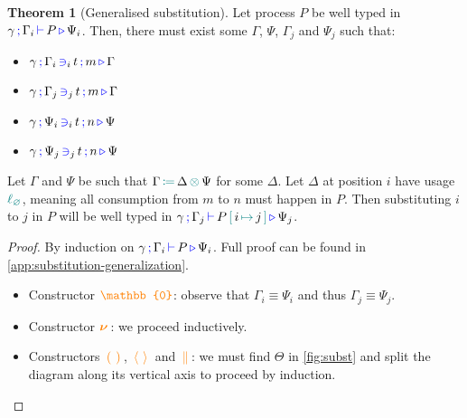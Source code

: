 \documentclass[sigplan,10pt,anonymous,review]{acmart}
\theoremstyle{definition}
\newtheorem{nitheorem}{Theorem}
\newcommand{\type}[1]{\textcolor{blue}{\operatorname{#1}}}
\newcommand{\constr}[1]{\textcolor{orange}{\operatorname{#1}}}
\newcommand{\func}[1]{\textcolor{teal}{\operatorname{#1}}}
\newcommand{\PO}{\constr{\mathbb{0}}}
\newcommand{\comp}[2]{#1 \, \constr{\parallel} \, #2}
\newcommand{\new}{\constr{\boldsymbol{\nu}} \,}
\newcommand{\send}[2]{#1 \, \constr{\langle} \, #2 \,\constr{\rangle} \,}
\newcommand{\recv}[2]{#1 \, \constr{\mathbb{(}} \, #2 \, \constr{\mathbb{)}} \,}
\newcommand{\subst}[3]{#1 \, \func{[} \, #3 \, \func{\mapsto} \,#2 \, \func{]}}
\newcommand{\opctx}[3]{#1 \, \func{\coloneqq} \, #2 \, \func{\otimes} \, #3}
\newcommand{\lz}{\func{\ell_{\varnothing}}}
\newcommand{\types}[4]{#1 \, \type{;} \, #2 \, \type{\vdash} \, #3 \, \type{\triangleright} \, #4}
\newcommand{\contains}[6]{#1 \, \type{;} \, #2 \, \type{\ni}_{#3} \, #4 \, \type{;} \, #5 \, \type{\triangleright} \, #6}
\begin{document}
\begin{nitheorem}[Generalised substitution]
  \label{thm:substitution-generalization}
  Let process $P$ be well typed in $\types{\gamma}{\Gamma_i}{P}{\Psi_i}$.
  Then, there must exist some $\Gamma$, $\Psi$, $\Gamma_j$ and $\Psi_j$ such that:
  \begin{multicols}{2}
  \begin{itemize}
    \item $\contains{\gamma}{\Gamma_i}{i}{t}{m}{\Gamma}$
    \item $\contains{\gamma}{\Gamma_j}{j}{t}{m}{\Gamma}$
    \item $\contains{\gamma}{\Psi_i}{i}{t}{n}{\Psi}$
    \item $\contains{\gamma}{\Psi_j}{j}{t}{n}{\Psi}$
  \end{itemize}
  \end{multicols}
  Let $\Gamma$ and $\Psi$ be such that $\opctx{\Gamma}{\Delta}{\Psi}$ for some $\Delta$.
  Let $\Delta$ at position $i$ have usage $\lz$, meaning all consumption from $m$ to $n$ must happen in $P$.
  Then substituting $i$ to $j$ in $P$ will be well typed in $\types{\gamma}{\Gamma_j}{\subst{P}{j}{i}}{\Psi_j}$.
\end{nitheorem}

\begin{proof}[Proof]
  By induction on $\types{\gamma}{\Gamma_i}{P}{\Psi_i}$.
  Full proof can be found in \autoref{app:substitution-generalization}.
  \begin{itemize}
   \item
     Constructor $\PO$: observe that $\Gamma_i \equiv \Psi_i$ and thus $\Gamma_j \equiv \Psi_j$.
   \item
     Constructor $\new$: we proceed inductively.
   \item
     Constructors $\recv{}{}$, $\send{}{}$ and $\comp{}{}$: we must find $\Theta$ in \autoref{fig:subst} and split the diagram along its vertical axis to proceed by induction. \qedhere
 \end{itemize}
\end{proof}
\end{document}
